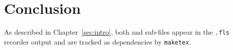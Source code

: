 \section{Conclusion}
\label{sec:conclusion}

As described in Chapter~\ref{sec:intro}, both \verb|| and
\verb|| sub-files appear in the \texttt{.fls} recorder output and
are tracked as dependencies by \texttt{maketex}.
